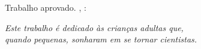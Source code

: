 \documentclass[
	12pt,				%
	openright,			%
	twoside,			%
	a4paper,			%
	english,			%
	brazil,				%
	]{abntex2}
\begin{document}
%
% 
%
\begin{folhadeaprovacao}

  \begin{center}
    {\ABNTEXchapterfont\large\imprimirautor}

    \vspace*{\fill}\vspace*{\fill}
    {\ABNTEXchapterfont\bfseries\Large\imprimirtitulo}
    \vspace*{\fill}
    
    \hspace{.45\textwidth}
    \begin{minipage}{.5\textwidth}
        \imprimirpreambulo
    \end{minipage}%
    \vspace*{\fill}
   \end{center}
    
   Trabalho aprovado. \imprimirlocal, \imprimirdata:

      
   \begin{center}
    \vspace*{0.5cm}
    {\large\imprimirlocal}
    \par
    {\large\imprimirdata}
    \vspace*{1cm}
  \end{center}
  
\end{folhadeaprovacao}

\begin{dedicatoria}
   \vspace*{\fill}
   \centering
   \noindent
   \textit{ Este trabalho é dedicado às crianças adultas que,\\
   quando pequenas, sonharam em se tornar cientistas.} \vspace*{\fill}
\end{dedicatoria}
\end{document}
